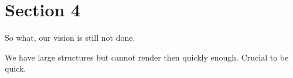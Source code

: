 \section{Section 4}

So what, our vision is still not done.

We have large structures but cannot render then quickly enough.
Crucial to be quick.



%
